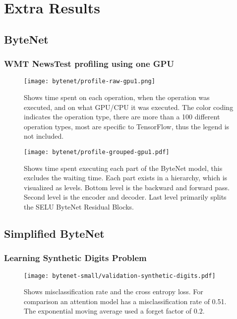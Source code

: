 \chapter{Extra Results}

\section{ByteNet}
\label{appendix:result:bytenet-profile}

\subsection{WMT NewsTest profiling using one GPU}
\begin{figure}[h]
    \centering
    \texttt{[image: bytenet/profile-raw-gpu1.png]}
    \caption{Shows time spent on each operation, when the operation was executed, and on what GPU/CPU it was executed. The color coding indicates the operation type, there are more than a 100 different operation types, most are specific to TensorFlow, thus the legend is not included.}
\end{figure}

\begin{figure}[h]
    \centering
    \texttt{[image: bytenet/profile-grouped-gpu1.pdf]}
    \caption{Shows time spent executing each part of the ByteNet model, this excludes the waiting time. Each part exists in a hierarchy, which is visualized as levels. Bottom level is the backward and forward pass. Second level is the encoder and decoder. Last level primarily splits the SELU ByteNet Residual Blocks.}
\end{figure}

\clearpage

\section{Simplified ByteNet}
\label{appendix:result:bytenet-small}
\subsection{Learning Synthetic Digits Problem}
\begin{figure}[h]
    \centering
    \texttt{[image: bytenet-small/validation-synthetic-digits.pdf]}
    \caption{Shows misclassification rate and the cross entropy loss. For comparison an attention model has a misclassification rate of 0.51. The exponential moving average used a forget factor of $0.2$.}
\end{figure}
\clearpage

